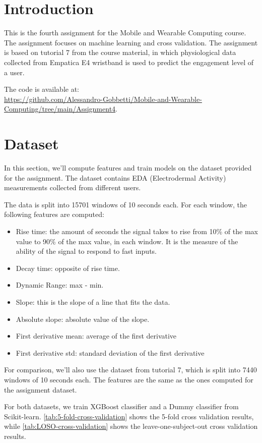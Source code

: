 \documentclass{usireport}
\begin{document}
\maketitlepage

\section{Introduction}
This is the fourth assignment for the Mobile and Wearable Computing course. The assignment focuses on machine learning and cross validation. The assignment is based on tutorial 7 from the course material, in which physiological data collected from Empatica E4 wristband is used to predict the engagement level of a user. 

The code is available at: \\\url{https://github.com/Alessandro-Gobbetti/Mobile-and-Wearable-Computing/tree/main/Assignment4}.


\section{Dataset}
In this section, we'll compute features and train models on the dataset provided for the assignment. The dataset contains EDA (Electrodermal Activity) measurements collected from different users. 

The data is split into 15701 windows of 10 seconds each. For each window, the following features are computed:
\begin{itemize}
    \item Rise time: the amount of seconds the signal takes to rise from 10\% of the max value to 90\% of the max value, in each window. It is the measure of the ability of the signal to respond to fast inputs.
    \item Decay time: opposite of rise time.
    \item Dynamic Range: max - min.
    \item Slope: this is the slope of a line that fits the data.
    \item Absolute slope: absolute value of the slope.
    \item First derivative mean: average of the first derivative
    \item First derivative std: standard deviation of the first derivative
\end{itemize}

For comparison, we'll also use the dataset from tutorial 7, which is split into 7440 windows of 10 seconds each. The features are the same as the ones computed for the assignment dataset.

For both datasets, we train XGBoost classifier and a Dummy classifier from Scikit-learn. \autoref{tab:5-fold-cross-validation} shows the 5-fold cross validation results, while \autoref{tab:LOSO-cross-validation} shows the leave-one-subject-out cross validation results.
\end{document}
